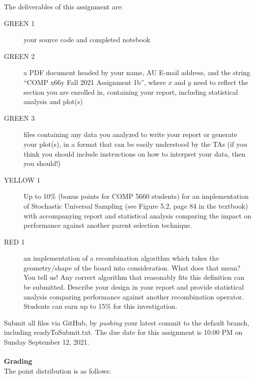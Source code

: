 \documentclass{article}
\begin{document}
The deliverables of this assignment are:
\begin{description}
\item[GREEN 1] your source code and completed notebook
\item[GREEN 2] a PDF document headed by your name, AU E-mail address, and the string ``COMP x66y Fall 2021 Assignment 1b'', where $x$ and $y$ need to reflect the section you are enrolled in, containing your report, including statistical analysis and plot(s)
\item[GREEN 3] files containing any data you analyzed to write your report or generate your plot(s), in a format that can be easily understood by the TAs (if you think you should include instructions on how to interpret your data, then you should!)
\item[YELLOW 1] Up to 10\% (bonus points for COMP 5660 students) for an implementation of Stochastic Universal Sampling (see Figure 5.2, page 84 in the textbook) with accompanying report and statistical analysis comparing the impact on performance against another parent selection technique.
\item[RED 1] an implementation of a recombination algorithm which takes the geometry/shape of the board into consideration. What does that mean? You tell us! Any correct algorithm that reasonably fits this definition can be submitted. Describe your design in your report and provide statistical analysis comparing performance against another recombination operator. Students can earn up to 15\% for this investigation.
\end{description}
Submit all files via GitHub, by \emph{pushing} your latest commit to the default branch, including readyToSubmit.txt. The due date for this assignment is 10:00 PM on Sunday September 12, 2021.
\\
\\
\textbf{Grading}\\
The point distribution is as follows:\\
\\
\end{document}
